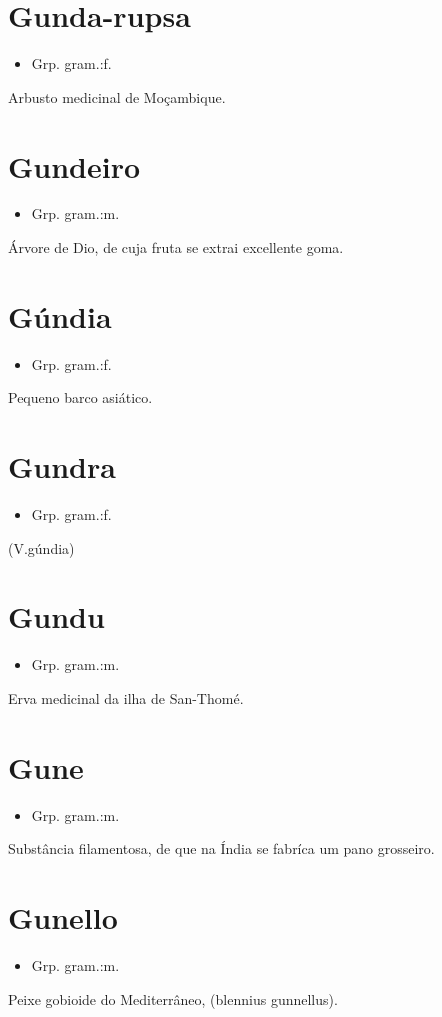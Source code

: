 \section{Gunda-rupsa}
\begin{itemize}
\item {Grp. gram.:f.}
\end{itemize}
Arbusto medicinal de Moçambique.
\section{Gundeiro}
\begin{itemize}
\item {Grp. gram.:m.}
\end{itemize}
Árvore de Dio, de cuja fruta se extrai excellente goma.
\section{Gúndia}
\begin{itemize}
\item {Grp. gram.:f.}
\end{itemize}
Pequeno barco asiático.
\section{Gundra}
\begin{itemize}
\item {Grp. gram.:f.}
\end{itemize}
(V.gúndia)
\section{Gundu}
\begin{itemize}
\item {Grp. gram.:m.}
\end{itemize}
Erva medicinal da ilha de San-Thomé.
\section{Gune}
\begin{itemize}
\item {Grp. gram.:m.}
\end{itemize}
Substância filamentosa, de que na Índia se fabríca um pano grosseiro.
\section{Gunello}
\begin{itemize}
\item {Grp. gram.:m.}
\end{itemize}
Peixe gobioide do Mediterrâneo, (\textunderscore blennius gunnellus\textunderscore ).

